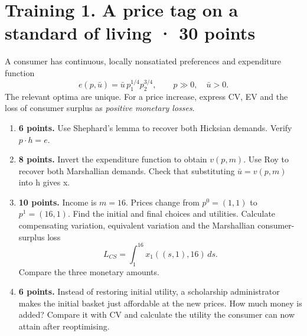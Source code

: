 \section*{Training 1. A price tag on a standard of living · 30 points}
A consumer has continuous, locally nonsatiated preferences and expenditure
function
\[
 e(p,\bar u)=\bar u\,p_1^{1/4}p_2^{3/4},\qquad p\gg0,\quad\bar u>0.
\]
The relevant optima are unique. For a price increase, express CV, EV and the
loss of consumer surplus as \emph{positive monetary losses}.
\begin{enumerate}[label=(\alph*)]
\item \textbf{6 points.} Use Shephard's lemma to recover both Hicksian
demands. Verify $p\cdot h=e$.
\item \textbf{8 points.} Invert the expenditure function to obtain $v(p,m)$.
Use Roy to recover both Marshallian demands. Check that substituting
$\bar u=v(p,m)$ into h gives x.
\item \textbf{10 points.} Income is $m=16$. Prices change from
$p^0=(1,1)$ to $p^1=(16,1)$. Find the initial and final choices and utilities.
Calculate compensating variation, equivalent variation and the Marshallian
consumer-surplus loss
\[
 L_{CS}=\int_1^{16}x_1((s,1),16)\,ds.
\]
Compare the three monetary amounts.
\item \textbf{6 points.} Instead of restoring initial utility, a scholarship
administrator makes the initial basket just affordable at the new prices.
How much money is added? Compare it with CV and calculate the utility the
consumer can now attain after reoptimising.
\end{enumerate}
